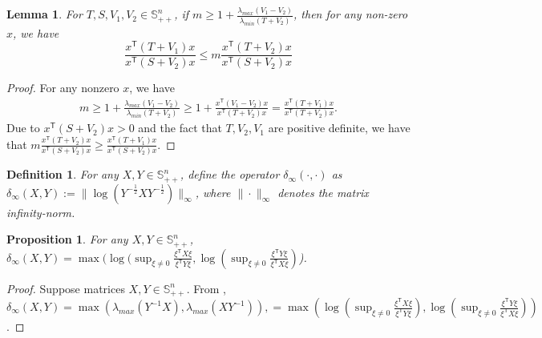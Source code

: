 \documentclass[letterpaper, 10 pt, conference]{ieeeconf}  %
\newcommand{\transpose}{\mathsf{T}}
\newcommand{\quadinner}[1]{x^{\transpose}(#1)x}
\newtheorem{lemma}{Lemma}
\newtheorem{definition}{Definition}
\newtheorem{proposition}{Proposition}
\begin{document}
\begin{lemma}\label{lemma:m}
    For $T,S,V_{1},V_{2}\in \mathbb{S}_{++}^{n}$, if
$       m \geq 1+\frac{\lambda_{max}(V_{1}-V_{2})}{\lambda_{min}(T+V_{2})}$,
    then for any non-zero $x$, we have
    \begin{equation}
        \frac{\quadinner{T+V_{1}}}{\quadinner{S+V_{2}}} \leq m\frac{\quadinner{T+V_{2}}}{\quadinner{S+V_{2}}}
    \end{equation}
\end{lemma}
\begin{proof}
    For any nonzero $x$, we have
    \begin{align*}
        m \geq 1+\frac{\lambda_{max}(V_{1}-V_{2})}{\lambda_{min}(T+V_{2})}
        \geq 1+ \frac{\quadinner{V_{1}-V_{2}}}{\quadinner{T+V_{2}}}
        = \frac{\quadinner{T+V_{1}}}{\quadinner{T+V_{2}}}.
     \end{align*}
     Due to $\quadinner{S+V_{2}} > 0$ and the fact that $T,V_{2},V_{1}$ are positive definite, we have that 
         $m\frac{\quadinner{T+V_{2}}}{\quadinner{S+V_{2}}} \geq \frac{\quadinner{T+V_{1}}}{\quadinner{S+V_{2}}}$.
\end{proof}


\begin{definition}
    For any $X,Y\in \mathbb{S}_{++}^{n}$, define the operator $\delta_{\infty}(\cdot, \cdot)$ as
  $ \delta_{\infty}(X, Y) := \| \log(Y^{-\frac{1}{2}}XY^{-\frac{1}{2}})\|_{\infty}$, where $\|\cdot\|_{\infty}$ denotes the matrix infinity-norm.
\end{definition}

\begin{proposition}\label{proposition:deltaRatio}
    For any $X,Y\in \mathbb{S}_{++}^{n}$,
$ \delta_{\infty}(X,Y) = \max(\log(\sup_{\xi\neq0} \frac{\xi^{\transpose}X\xi}{\xi^{\transpose}Y\xi},\log(\sup_{\xi\neq0} \frac{\xi^{\transpose}Y\xi}{\xi^{\transpose}X\xi})$).
\end{proposition}
\begin{proof}
    Suppose matrices $X,Y\in\mathbb{S}_{++}^{n}$. From \cite[Remark 2.2.]{lee_invariant_2008}, $\delta_{\infty}(X,Y) = \max(\lambda_{max}(Y^{-1}X),\lambda_{max}(XY^{-1})), = \max(\log(\sup_{\xi\neq0} \frac{\xi^{\transpose}X\xi}{\xi^{\transpose}Y\xi}),\log(\sup_{\xi\neq0} \frac{\xi^{\transpose}Y\xi}{\xi^{\transpose}X\xi}))$.
\end{proof}
\end{document}
